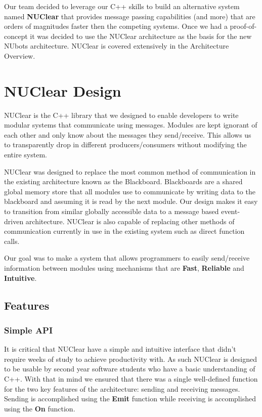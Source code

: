 \documentclass[english,12pt]{scrartcl}
\begin{document}
				Our team decided to leverage our C++ skills to build an alternative system named \textbf{NUClear} that provides message passing capabilities (and more) that are orders of magnitudes faster then the competing systems.
				Once we had a proof-of-concept it was decided to use the NUClear architecture as the basis for the new NUbots architecture. NUClear is covered extensively in the Architecture Overview.

	\section{NUClear Design}
		NUClear is the C++ library that we designed to enable developers to write modular systems that communicate using messages.
		Modules are kept ignorant of each other and only know about the messages they send/receive.
		This allows us to transparently drop in different producers/consumers without modifying the entire system.

		NUClear was designed to replace the most common method of communication in the existing architecture known as the Blackboard.
		Blackboards are a shared global memory store that all modules use to communicate by writing data to the blackboard and assuming it is read by the next module.
		Our design makes it easy to transition from similar globally accessible data to a message based event-driven architecture.
		NUClear is also capable of replacing other methods of communication currently in use in the existing system such as direct function calls.

		Our goal was to make a system that allows programmers to easily send/receive information between modules using mechanisms that are \textbf{Fast}, \textbf{Reliable} and \textbf{Intuitive}.

		\subsection{Features}
			\subsubsection{Simple API}
				It is critical that NUClear have a simple and intuitive interface that didn't require weeks of study to achieve productivity with.
				As such NUClear is designed to be usable by second year software students who have a basic understanding of C++.
				With that in mind we ensured that there was a single well-defined function for the two key features of the architecture: sending and receiving messages. Sending is accomplished using the \textbf{Emit} function while receiving is accomplished using the \textbf{On} function.
\end{document}
